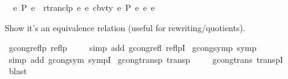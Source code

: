 \begin{isabellebody}
\isanewline
\ \ {\isachardoublequoteopen}e\ {\isacharminus}{\kern0pt}{\isachargreater}{\kern0pt}{\isacharbraceleft}{\kern0pt}P{\isacharbraceright}{\kern0pt}{\isacharasterisk}{\kern0pt}\ e{\isacharprime}{\kern0pt}\ {\isasymequiv}\ rtranclp\ {\isacharparenleft}{\kern0pt}{\isasymlambda}e\ e{\isacharprime}{\kern0pt}{\isachardot}{\kern0pt}\ cbv{\isacharunderscore}{\kern0pt}ty\ e\ P\ e{\isacharprime}{\kern0pt}{\isacharparenright}{\kern0pt}\ e\ e{\isacharprime}{\kern0pt}{\isachardoublequoteclose}%
\isadelimdocument
%
\endisadelimdocument
%
\isatagdocument
%
\isamarkuptrue%
%
\endisatagdocument
{\isafolddocument}%
%
\isadelimdocument
%
\endisadelimdocument
%
\begin{isamarkuptext}%
Show it's an equivalence relation (useful for rewriting/quotients).%
\end{isamarkuptext}\isamarkuptrue%
\isamarkupfalse%
\ gcong{\isacharunderscore}{\kern0pt}reflp{\isacharcolon}{\kern0pt}\ {\isachardoublequoteopen}reflp\ {\isacharparenleft}{\kern0pt}{\isasymsimeq}{\isacharparenright}{\kern0pt}{\isachardoublequoteclose}\isanewline
%
\isadelimproof
\ \ %
\endisadelimproof
%
\isatagproof
{}\isamarkupfalse%
\ {\isacharparenleft}{\kern0pt}simp\ add{\isacharcolon}{\kern0pt}\ gcong{\isachardot}{\kern0pt}refl\ reflpI{\isacharparenright}{\kern0pt}%
\endisatagproof
{\isafoldproof}%
%
\isadelimproof
\isanewline
%
\endisadelimproof
\isanewline
{}\isamarkupfalse%
\ gcong{\isacharunderscore}{\kern0pt}symp{\isacharcolon}{\kern0pt}\ {\isachardoublequoteopen}symp\ {\isacharparenleft}{\kern0pt}{\isasymsimeq}{\isacharparenright}{\kern0pt}{\isachardoublequoteclose}\isanewline
%
\isadelimproof
\ \ %
\endisadelimproof
%
\isatagproof
{}\isamarkupfalse%
\ {\isacharparenleft}{\kern0pt}simp\ add{\isacharcolon}{\kern0pt}\ gcong{\isachardot}{\kern0pt}sym\ sympI{\isacharparenright}{\kern0pt}%
\endisatagproof
{\isafoldproof}%
%
\isadelimproof
\isanewline
%
\endisadelimproof
\isanewline
{}\isamarkupfalse%
\ gcong{\isacharunderscore}{\kern0pt}transp{\isacharcolon}{\kern0pt}\ {\isachardoublequoteopen}transp\ {\isacharparenleft}{\kern0pt}{\isasymsimeq}{\isacharparenright}{\kern0pt}{\isachardoublequoteclose}\isanewline
%
\isadelimproof
\ \ %
\endisadelimproof
%
\isatagproof
{}\isamarkupfalse%
\ gcong{\isachardot}{\kern0pt}trans\ transpI\ \isamarkupfalse%
\ blast%
\endisatagproof
{\isafoldproof}%
%
\isadelimproof
\isanewline
%
\endisadelimproof
\isanewline

\end{isabellebody}
